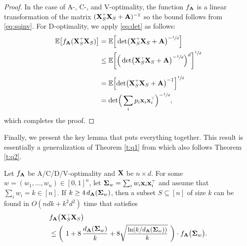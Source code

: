 \documentclass[thesis.tex]{subfiles}
\begin{document}
\begin{proof}
  In the case of A-, C-, and V-optimality, the function $f_{\mathbf A}$ is a
  linear transformation of the matrix $(\X_S^\top\X_S+\A)^{-1}$ so the
  bound follows from \eqref{eq:sqinv}. For D-optimality, we apply
  \eqref{eq:det} as follows:
  \begin{align*}
    \E\big[f_{\A}(\X_S^\top\X_S)\big]
    & = \E\Big[\det\!\big(\X_S^\top\X_S+\A\big)^{-\sfrac1d}\Big] \\
    &\leq
     \E\bigg[\Big(\det\!\big(\X_S^\top\X_S+\A\big)^{-\sfrac1d}\Big)^d\bigg]^{\sfrac1d} \\
    \\ &=  \E\Big[\!\det\!\big(\X_S^\top\X_S+\A\big)^{-1}\Big]^{\sfrac1d}\\
       &=
         \det\!\Big(\sum_i p_i\x_i\x_i^\top\Big)^{-\sfrac1d},
  \end{align*}
  which completes the proof.
\end{proof}
Finally, we present the key lemma that puts everything together. This
result is essentially a generalization of Theorem \ref{t:q1} from
which also follows Theorem \ref{t:q2}.
\begin{lemma}\label{l:guarantees}
  Let $f_{\mathbf A}$ be A/C/D/V-optimality and $\mathbf X$ be $n\times
  d$.  For some $w=(w_1,\dots,w_n)\in[0,1]^n$, let
  $\Sigmab_w=\sum_iw_i\x_i\x_i^\top$ and assume that
  $\sum_i w_i=k\in[n]$. If $k\geq 4\,d_{\mathbf A}(\mathbf{\Sigma}_w)$, then a
subset $S\subseteq[n]$ of size $k$ can be found in $O(ndk+k^2d^2)$ time that satisfies
  \begin{align*}
    &f_{\A}\big(\X_S^\top\X_S\big)  \\
    &\leq \bigg(\ 1+8\,\frac{d_{\A}(\Sigmab_w)}{k} + 8\sqrtshort{\frac{\ln (k/d_{\A}(\Sigmab_w))}{k}}\ \bigg)\cdot f_{\A}\big(\Sigmab_w\big).
  \end{align*}
  \end{lemma}
\end{document}
